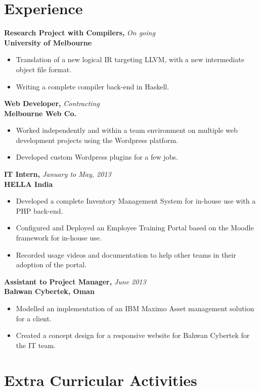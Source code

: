 \documentclass[overlapped]{res}
\begin{document}
\begin{resume}
  \section{Experience}
  \textbf{Research Project with Compilers,} \hfill \textit{On going}\\
  \textbf{University of Melbourne}
  \begin{itemize}
  \item Translation of a new logical IR targeting LLVM, with a new intermediate
    object file format. 
  \item Writing a complete compiler back-end in Haskell. 
  \end{itemize}

  \textbf{Web Developer,} \hfill \textit{Contracting}\\
  \textbf{Melbourne Web Co.}
  \begin{itemize}
  \item Worked independently and within a team environment on multiple web 
    development projects using the Wordpress platform.
  \item Developed custom Wordpress plugins for a few jobs.  
  \end{itemize}

  \textbf{IT Intern,} \hfill \textit{January to May, 2013}\\
  \textbf{HELLA India}
  \begin{itemize}
  \item Developed a complete Inventory Management System for in-house use with
    a PHP back-end. 
  \item Configured and Deployed an Employee Training Portal based on the
    Moodle framework for in-house use.
  \item Recorded usage videos and documentation to help other teams in their
    adoption of the portal.
  \end{itemize}
  
  \textbf{Assistant to Project Manager,}  \hfill \textit{June 2013}\\
  \textbf{Bahwan Cybertek, Oman}
  \begin{itemize}
  \item Modelled an implementation of an IBM Maximo Asset management 
    solution for a client. 
  \item Created a concept design for a responsive website for Bahwan Cybertek 
    for the IT team. 
  \end{itemize}

  \section{Extra Curricular Activities}  


\end{resume}
\end{document}

